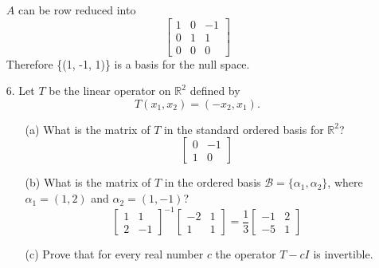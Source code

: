 \documentclass{article}
\begin{document}
\begin{enumerate}[listparindent=\parindent]
\(A\) can be row reduced into
\[ \begin{bmatrix} 1 & 0 & -1 \\ 0 & 1 & 1 \\ 0 & 0 & 0 \end{bmatrix} \]
Therefore \{(1, -1, 1)\} is a basis for the null space.

\item[6.] Let \(T\) be the linear operator on \(\mathbb{R}^2\) defined by
    \[ T(x_1, x_2) = (-x_2, x_1). \]

    \begin{enumerate}[listparindent=\parindent]
        \item[(a)] What is the matrix of \(T\) in the standard ordered basis for \(\mathbb{R}^2\)?
            \[ \begin{bmatrix} 0 & -1 \\ 1 & 0 \end{bmatrix} \]

        \item[(b)] What is the matrix of \(T\) in the ordered basis \(\mathcal{B} = \{\alpha_1, \alpha_2\}\),
            where \(\alpha_1 = (1, 2)\) and \(\alpha_2 = (1, -1)\)?
            \[
                \begin{bmatrix} 1 & 1 \\ 2 & -1 \end{bmatrix}^{-1}
                \begin{bmatrix} -2 & 1 \\ 1 & 1 \end{bmatrix}
                =
                \frac{1}{3}
                \begin{bmatrix} -1 & 2 \\ -5 & 1 \end{bmatrix}
            \]

        \item[(c)] Prove that for every real number \(c\) the operator \(T - cI\) is invertible.


\end{enumerate}
\end{enumerate}
\end{document}
